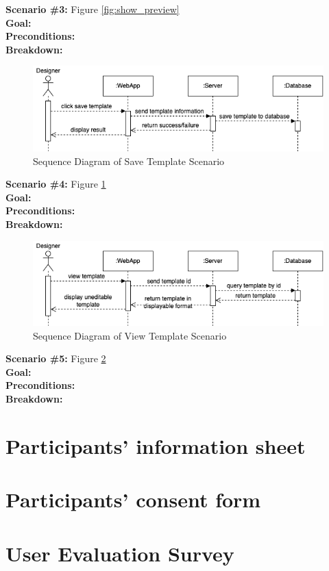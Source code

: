\noindent
\textbf{Scenario \#3:} Figure \ref{fig:show_preview} \\
\textbf{Goal:} \\
\textbf{Preconditions:} \\
\textbf{Breakdown:} \\

\begin{figure}[ht!]
    \centering
    \includegraphics[width=\textwidth]{overleaf/images/save_template.png}
    \caption{Sequence Diagram of Save Template Scenario}
    \label{fig:save_template}
\end{figure}

\noindent
\textbf{Scenario \#4:} Figure \ref{fig:save_template} \\
\textbf{Goal:} \\
\textbf{Preconditions:} \\
\textbf{Breakdown:} \\

\begin{figure}[ht!]
    \centering
    \includegraphics[width=\textwidth]{overleaf/images/view_template.png}
    \caption{Sequence Diagram of View Template Scenario}
    \label{fig:view_template}
\end{figure}

\noindent
\textbf{Scenario \#5:} Figure \ref{fig:view_template} \\
\textbf{Goal:} \\
\textbf{Preconditions:} \\
\textbf{Breakdown:} \\



\chapter{Participants' information sheet}


\chapter{Participants' consent form}


\chapter{User Evaluation Survey}

